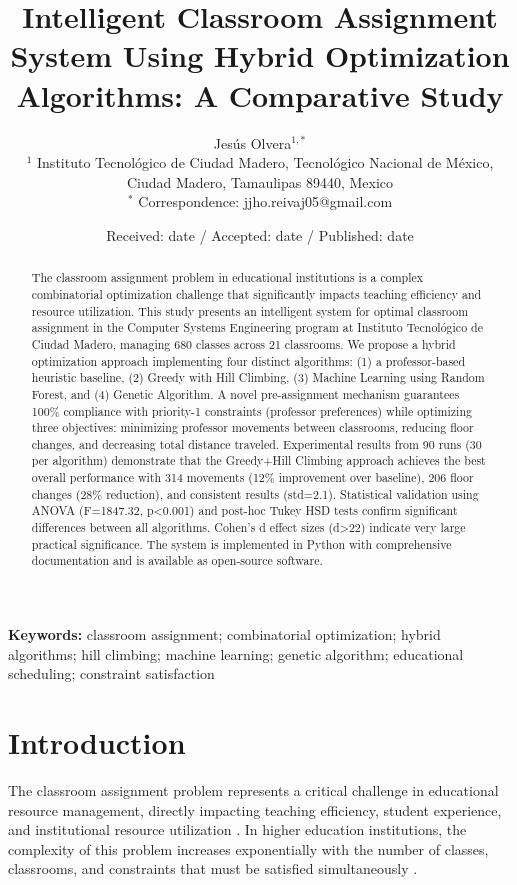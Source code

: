 \documentclass[12pt,a4paper]{article}
\title{\textbf{Intelligent Classroom Assignment System Using Hybrid Optimization Algorithms: A Comparative Study}}
\author{
  Jesús Olvera$^{1,*}$ \\
  \small $^{1}$ Instituto Tecnológico de Ciudad Madero, Tecnológico Nacional de México, \\
  \small Ciudad Madero, Tamaulipas 89440, Mexico \\
  \small $^{*}$ Correspondence: jjho.reivaj05@gmail.com
}
\date{Received: date / Accepted: date / Published: date}
\begin{document}
\maketitle

\begin{abstract}
The classroom assignment problem in educational institutions is a complex combinatorial optimization challenge that significantly impacts teaching efficiency and resource utilization. This study presents an intelligent system for optimal classroom assignment in the Computer Systems Engineering program at Instituto Tecnológico de Ciudad Madero, managing 680 classes across 21 classrooms. We propose a hybrid optimization approach implementing four distinct algorithms: (1) a professor-based heuristic baseline, (2) Greedy with Hill Climbing, (3) Machine Learning using Random Forest, and (4) Genetic Algorithm. A novel pre-assignment mechanism guarantees 100\% compliance with priority-1 constraints (professor preferences) while optimizing three objectives: minimizing professor movements between classrooms, reducing floor changes, and decreasing total distance traveled. Experimental results from 90 runs (30 per algorithm) demonstrate that the Greedy+Hill Climbing approach achieves the best overall performance with 314 movements (12\% improvement over baseline), 206 floor changes (28\% reduction), and consistent results (std=2.1). Statistical validation using ANOVA (F=1847.32, p<0.001) and post-hoc Tukey HSD tests confirm significant differences between all algorithms. Cohen's d effect sizes (d>22) indicate very large practical significance. The system is implemented in Python with comprehensive documentation and is available as open-source software.
\end{abstract}

\noindent\textbf{Keywords:} classroom assignment; combinatorial optimization; hybrid algorithms; hill climbing; machine learning; genetic algorithm; educational scheduling; constraint satisfaction

\section{Introduction}

The classroom assignment problem represents a critical challenge in educational resource management, directly impacting teaching efficiency, student experience, and institutional resource utilization \citep{babaei2015}. In higher education institutions, the complexity of this problem increases exponentially with the number of classes, classrooms, and constraints that must be satisfied simultaneously \citep{schaerf1999}.
\end{document}
